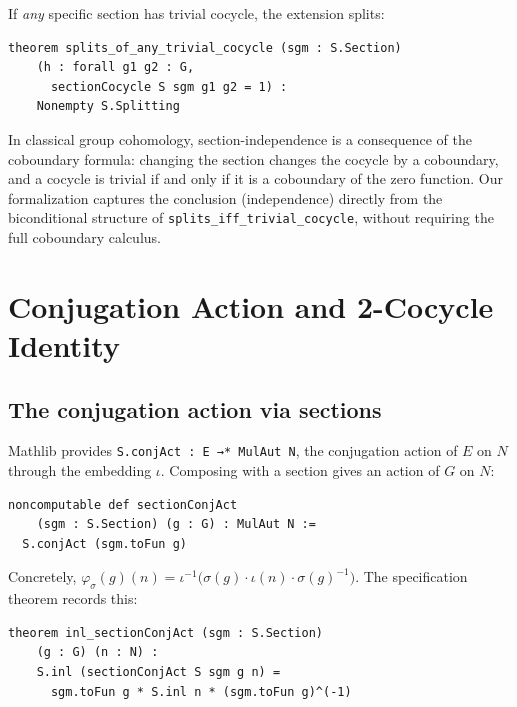 \documentclass[11pt]{article}
\newcommand{\lean}[1]{\texttt{#1}}
\begin{document}
\begin{theorem}\label{thm:any-trivial}
If \emph{any} specific section has trivial cocycle, the extension splits:
\begin{lstlisting}
theorem splits_of_any_trivial_cocycle (sgm : S.Section)
    (h : forall g1 g2 : G,
      sectionCocycle S sgm g1 g2 = 1) :
    Nonempty S.Splitting
\end{lstlisting}
\end{theorem}

\noindent
In classical group cohomology, section-independence is a consequence of the
coboundary formula: changing the section changes the cocycle by a coboundary, and
a cocycle is trivial if and only if it is a coboundary of the zero function.
Our formalization captures the conclusion (independence) directly from the
biconditional structure of \lean{splits\_iff\_trivial\_cocycle}, without requiring
the full coboundary calculus.

\section{Conjugation Action and 2-Cocycle Identity}\label{sec:conjact}

\subsection{The conjugation action via sections}\label{sec:conj-via-section}

Mathlib provides \lean{S.conjAct : E →* MulAut N}, the conjugation action of $E$
on $N$ through the embedding $\iota$.  Composing with a section gives an action of
$G$ on $N$:

\begin{definition}\label{def:conj-act}
\begin{lstlisting}
noncomputable def sectionConjAct
    (sgm : S.Section) (g : G) : MulAut N :=
  S.conjAct (sgm.toFun g)
\end{lstlisting}
\end{definition}

\noindent
Concretely, $\varphi_\sigma(g)(n) = \iota^{-1}\bigl(\sigma(g) \cdot \iota(n) \cdot
\sigma(g)^{-1}\bigr)$.  The specification theorem records this:

\begin{theorem}\label{thm:conj-spec}
\begin{lstlisting}
theorem inl_sectionConjAct (sgm : S.Section)
    (g : G) (n : N) :
    S.inl (sectionConjAct S sgm g n) =
      sgm.toFun g * S.inl n * (sgm.toFun g)^(-1)
\end{lstlisting}
\end{theorem}
\end{document}

